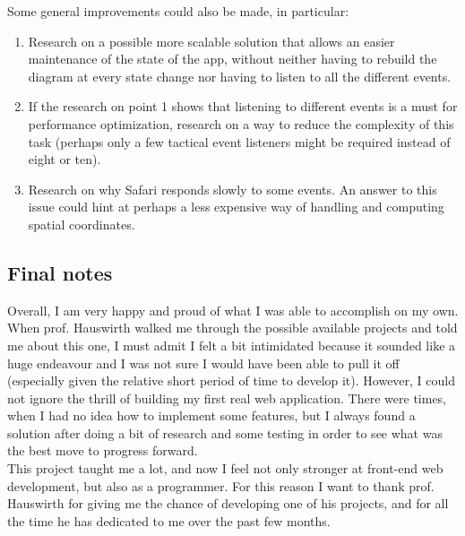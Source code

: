 \documentclass[]{usiinfbachelorproject}
\begin{document}
\vspace{\fill}
\pagebreak

\noindent Some general improvements could also be made, in particular:

\begin{enumerate}
	\item Research on a possible more scalable solution that allows an easier maintenance of the state of the app, without neither having to rebuild the diagram at every state change nor having to listen to all the different events.
	\item If the research on point 1 shows that listening to different events is a must for performance optimization, research on a way to reduce the complexity of this task (perhaps only a few tactical event listeners might be required instead of eight or ten).
	\item Research on why Safari responds slowly to some events. An answer to this issue could hint at perhaps a less expensive way of handling and computing spatial coordinates.
\end{enumerate}

\subsection{Final notes}

Overall, I am very happy and proud of what I was able to accomplish on my own. When prof. Hauswirth walked me through the possible available projects and told me about this one, I must admit I felt a bit intimidated because it sounded like a huge endeavour and I was not sure I would have been able to pull it off (especially given the relative short period of time to develop it). However, I could not ignore the thrill of building my first real web application. There were times, when I had no idea how to implement some features, but I always found a solution after doing a bit of research and some testing in order to see what was the best move to progress forward.\\
This project taught me a lot, and now I feel not only stronger at front-end web development, but also as a programmer. For this reason I want to thank prof. Hauswirth for giving me the chance of developing one of his projects, and for all the time he has dedicated to me over the past few months.

\vspace{\fill}

\pagebreak




\end{document}
